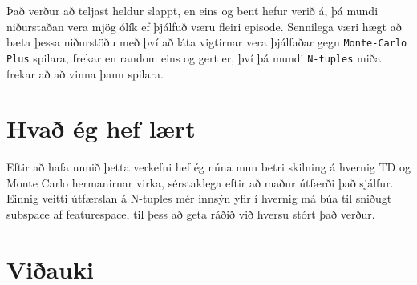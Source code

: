 \documentclass[12pt]{article}
\begin{document}
Það verður að teljast heldur slappt, en eins og bent hefur verið á, þá mundi
niðurstaðan vera mjög ólík ef þjálfuð væru fleiri episode. Sennilega
væri hægt að bæta þessa niðurstöðu með því að láta vigtirnar vera þjálfaðar
gegn \verb|Monte-Carlo Plus| spilara, frekar en random eins og gert er,
því þá mundi \verb|N-tuples| miða frekar að að vinna þann spilara.


\section{Hvað ég hef lært}
Eftir að hafa unnið þetta verkefni hef ég núna mun betri skilning á hvernig TD og Monte Carlo
hermanirnar virka, sérstaklega eftir að maður útfærði það sjálfur. Einnig veitti
útfærslan á N-tuples mér innsýn yfir í hvernig má búa til sniðugt subspace
af featurespace, til þess að geta ráðið við hversu stórt það verður.

\section{Viðauki}


\end{document}
